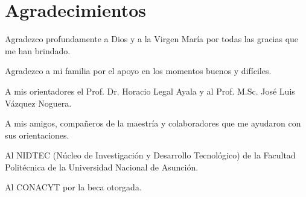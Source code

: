 \chapter*{Agradecimientos}

\noindent Agradezco profundamente a Dios y a la Virgen María por todas las gracias que me han brindado.

\noindent Agradezco a mi familia por el apoyo en los momentos buenos y difíciles.

\noindent A mis orientadores el Prof. Dr. Horacio Legal Ayala y al Prof. M.Sc. José Luis Vázquez Noguera.

\noindent A mis amigos, compañeros de la maestría y colaboradores que me ayudaron con sus orientaciones.

\noindent Al NIDTEC (Núcleo de Investigación y Desarrollo Tecnológico) de la Facultad Politécnica de la Universidad Nacional de Asunci\'on.

\noindent Al CONACYT por la beca otorgada.
